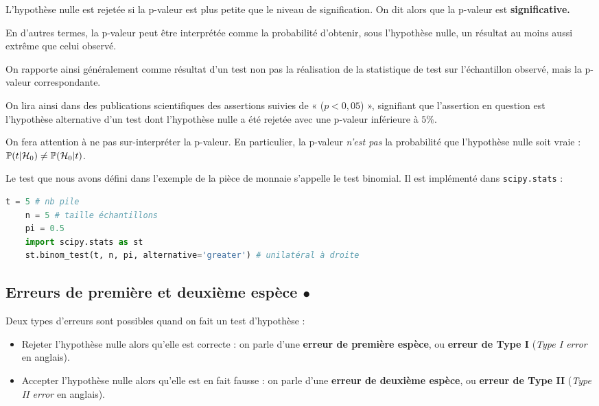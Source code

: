 L'hypothèse nulle est rejetée si la p-valeur est plus petite que le niveau de
signification. On dit alors que la p-valeur est \textbf{significative.}

En d'autres termes, la p-valeur peut être interprétée comme la probabilité
d'obtenir, sous l'hypothèse nulle, un résultat au moins aussi extrême que celui
observé.

On rapporte ainsi généralement comme résultat d'un test non pas la réalisation
de la statistique de test sur l'échantillon observé, mais la p-valeur
correspondante.

On lira ainsi dans des publications scientifiques des assertions suivies de «
($p < 0,05$) », signifiant que l'assertion en question est l'hypothèse
alternative d'un test dont l'hypothèse nulle a été rejetée avec une p-valeur
inférieure à $5\%.$

\begin{attention}
  On fera attention à ne pas sur-interpréter la p-valeur. En particulier, la
  p-valeur \textit{n'est pas} la probabilité que l'hypothèse nulle soit vraie :
  $\mathbb{P}(t|\mathcal{H}_0) \neq \mathbb{P}(\mathcal{H}_0|t)$.
\end{attention}

\newpage
\begin{exemple}
  Le test que nous avons défini dans l'exemple de la pièce de monnaie s'appelle
  le test binomial. Il est implémenté dans \texttt{scipy.stats} :
  \begin{lstlisting}[language=Python]
    t = 5 # nb pile 
    n = 5 # taille échantillons 
    pi = 0.5 
    import scipy.stats as st 
    st.binom_test(t, n, pi, alternative='greater') # unilatéral à droite
  \end{lstlisting}
\end{exemple}



\subsection{Erreurs de première et deuxième espèce $\bullet$}
\label{sec:test_errors}
Deux types d'erreurs sont possibles quand on fait un test d'hypothèse :
\begin{itemize}
\item Rejeter l'hypothèse nulle alors qu'elle est correcte : on parle d'une
  \textbf{erreur de première espèce}, ou \textbf{erreur de Type I}
  (\textit{Type I error} en anglais).
\item Accepter l'hypothèse nulle alors qu'elle est en fait fausse : on parle
  d'une \textbf{erreur de deuxième espèce}, ou \textbf{erreur de Type II}
  (\textit{Type II error} en anglais).
\end{itemize}

